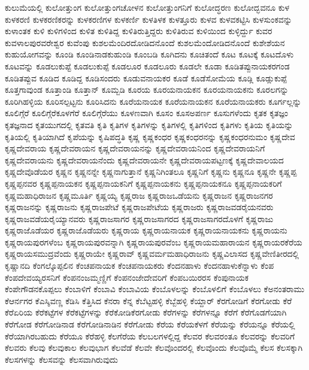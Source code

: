 {ಕುಲುಮೆಯಲ್ಲಿ
ಕುಲೋತ್ತುಂಗ
ಕುಲೋತ್ತುಂಗಚೋಳನ
ಕುಲೋತ್ತುಂಗನಿಗೆ
ಕುಲೋದ್ಧರಣ
ಕುಲೋದ್ಭವನೂ
ಕುಳ
ಕುಳಕರಣಿ
ಕುಳಕರಣಿಕರನ್ನು
ಕುಳಕರಣಿಗಳ
ಕುಳಕರ್ಣಿ
ಕುಳತಿಳಕ
ಕುಳತ್ತೂರು
ಕುಳವ
ಕುಳವಕಟ್ಟಿಸಿ
ಕುಳಸುಂಕವನ್ನು
ಕುಳಾಂತಕ
ಕುಳಿ
ಕುಳಿಗಳಿಂದ
ಕುಳಿತ
ಕುಳಿತಿದ್ದ
ಕುಳಿತಿರುತ್ತಿದ್ದರು
ಕುಳಿತಿರುವ
ಕುಳಿಯಿಂದ
ಕುಳ್ಳಿರ್ದ್ದು
ಕುವರ
ಕುವಳಾಲಪುರವರೇಶ್ವರ
ಕುವೆಂಪು
ಕುಶಲಮೆಂದಿರದೋಡಿದನೊಂದೆ
ಕುಶಲಮೆಂದೋಡಿದನೊಂದೆ
ಕುಶೇಶೆಯನ
ಕುಹುಯೋಗವನ್ನು
ಕೂಂಡಿ
ಕೂಂಡಿನಾಡಕುಹುಂಡಿ
ಕೂಂಬಡಿ
ಕೂಗಿದನು
ಕೂಚಿತಂದೆ
ಕೂಟ
ಕೂಟಕ್ಕೆ
ಕೂಟದೊಳು
ಕೂಟವನ್ನು
ಕೂಡಲುಕುಪ್ಟೆ
ಕೂಡಲುಕುಪ್ಪೆ
ಕೂಡಲೂರ
ಕೂಡಲೂರು
ಕೂಡಲೇ
ಕೂಡಾ
ಕೂಡಿತಪ್ಪುನಾಯಕರಗಂಡ
ಕೂಡಿತಪ್ಪುವ
ಕೂಡಿದ
ಕೂಡಿದ್ದ
ಕೂಡಿಸಂದರು
ಕೂಡುವನಾಯಕರ
ಕೂಡೆ
ಕೂಡೆಸೋಮೆಯ
ಕೂಡ್ಲಿ
ಕೂಡ್ಲುಕುಪ್ಪೆ
ಕೂತ್ತಗಾವುಂಡ
ಕೂತ್ತಾಂಡಿ
ಕೂತ್ತಾನ್
ಕೂಮ್ಬಡಿ
ಕೂರಯ
ಕೂರಯನಾಯಕನ
ಕೂರಯನಾಯಕನು
ಕೂರಲಗನ್ನು
ಕೂರಿಗಿಹಳ್ಳಿಯ
ಕೂರಿಸಲ್ಪಟ್ಟನು
ಕೂರಿಸಿದನು
ಕೂರೆಯನಾಯಕ
ಕೂರೆಯನಾಯಕನ
ಕೂರೆಯನಾಯಕರು
ಕೂರ್ಗಲ್ಲನ್ನು
ಕೂಲಿಗ್ಗೆರೆ
ಕೂಲಿಗ್ಗೆರೆಕೂಳಗೆರೆ
ಕೂಲಿಗ್ಗೆರೆಯು
ಕೂಳಣವಾಗಿ
ಕೂಸಂ
ಕೂಸಅಪರ್ಣ
ಕೂಸುಗಳೆಂದು
ಕೃತಕ
ಕೃತಜ್ಞಂ
ಕೃತಜ್ಞನಾದ
ಕೃತಯುಗದಲ್ಲಿ
ಕೃತವತಿ
ಕೃತಿ
ಕೃತಿಗಳ
ಕೃತಿಗಳನ್ನು
ಕೃತಿಗಳಲ್ಲಿ
ಕೃತಿಗಳಿಂದ
ಕೃತಿಗಳು
ಕೃತಿಯ
ಕೃತಿಯನ್ನು
ಕೃತಿಯಲ್ಲಿ
ಕೃತಿಯಾಗಿದೆ
ಕೃಪೆಯನ್ನು
ಕೃಷಿಪದ್ಧತಿ
ಕೃಷ್ಣ
ಕೃಷ್ಣಕಂಧರ
ಕೃಷ್ಣಕಂಧರನನ್ನು
ಕೃಷ್ಣಕಂಧರನುಮಂ
ಕೃಷ್ಣದೇವ
ಕೃಷ್ಣದೇವರಾಯ
ಕೃಷ್ಣದೇವರಾಯನ
ಕೃಷ್ಣದೇವರಾಯನನ್ನು
ಕೃಷ್ಣದೇವರಾಯನಿಂದ
ಕೃಷ್ಣದೇವರಾಯನಿಗೆ
ಕೃಷ್ಣದೇವರಾಯನು
ಕೃಷ್ಣದೇವರಾಯನೆಂದು
ಕೃಷ್ಣದೇವರಾಯನೇ
ಕೃಷ್ಣದೇವರಾಯಪಟ್ಟಣಕ್ಕೆ
ಕೃಷ್ಣದೇವಾಲಯದ
ಕೃಷ್ಣದೇವೊಡೆಯರ
ಕೃಷ್ಣನ
ಕೃಷ್ಣನನ್ನೇ
ಕೃಷ್ಣನಾಗುತ್ತಾನೆ
ಕೃಷ್ಣನಿಗಿಂತಲೂ
ಕೃಷ್ಣನಿಗೆ
ಕೃಷ್ಣನು
ಕೃಷ್ಣನೂ
ಕೃಷ್ಣನೇ
ಕೃಷ್ಣಪ್ಪ
ಕೃಷ್ಣಪ್ಪನವರ
ಕೃಷ್ಣಪ್ಪನಾಯಕನ
ಕೃಷ್ಣಪ್ಪನಾಯಕನಿಗೆ
ಕೃಷ್ಣಪ್ಪನಾಯಕನು
ಕೃಷ್ಣಪ್ಪನಾಯಕನೂ
ಕೃಷ್ಣಪ್ಪನಾಯಕರಿಗೆ
ಕೃಷ್ಣಮಹಾಧಿರಾಜನ
ಕೃಷ್ಣಮೂರ್ತಿ
ಕೃಷ್ಣಯ್ಯ
ಕೃಷ್ಣರಾಜ
ಕೃಷ್ಣರಾಜಒಡೆಯನು
ಕೃಷ್ಣರಾಜನ
ಕೃಷ್ಣರಾಜನಗರ
ಕೃಷ್ಣರಾಜನನ್ನು
ಕೃಷ್ಣರಾಜನು
ಕೃಷ್ಣರಾಜಪೇಟೆ
ಕೃಷ್ಣರಾಜಪೇಟೆಯ
ಕೃಷ್ಣರಾಜರು
ಕೃಷ್ಣರಾಜವಡರೈಯನವರು
ಕೃಷ್ಣರಾಜವಡೆಯರೈಯ್ಯಾನವರು
ಕೃಷ್ಣರಾಜಸಾಗರ
ಕೃಷ್ಣರಾಜಸಾಗರದ
ಕೃಷ್ಣರಾಜಸಾಗರದೊಳಗೆ
ಕೃಷ್ಣರಾಜು
ಕೃಷ್ಣರಾಜೊಡೆಯರ
ಕೃಷ್ಣರಾಜೊಡೆಯರು
ಕೃಷ್ಣರಾಯ
ಕೃಷ್ಣರಾಯನಾಯಕ
ಕೃಷ್ಣರಾಯನಾಯಕನು
ಕೃಷ್ಣರಾಯನು
ಕೃಷ್ಣರಾಯಪುರಗಳೆಂಬ
ಕೃಷ್ಣರಾಯಪುರವನ್ನಾಗಿ
ಕೃಷ್ಣರಾಯಪುರವೆಂಬ
ಕೃಷ್ಣರಾಯಮಹಾರಾಯನ
ಕೃಷ್ಣರಾಯರಕೆರೆಯ
ಕೃಷ್ಣರಾಯಸಮುದ್ರವೆಂದು
ಕೃಷ್ಣರಾಯೇ
ಕೃಷ್ಣರಾವ್
ಕೃಷ್ಣವರ್ಮಮಹಾಧಿರಾಜನು
ಕೃಷ್ಣವಿಲಾಸದ
ಕೃಷ್ಣವೇಣಿತೀರದಲ್ಲಿ
ಕೃಷ್ಣಾನದಿ
ಕೆಂಗಲ್ಕೊಪ್ಪಲಿನ
ಕೆಂಚಪನಾಯಕ
ಕೆಂಚಪನಾಯಕರು
ಕೆಂದನಹಾಳು
ಕೆಂದನಹಾಳುಕೆನ್ನಾಳು
ಕೆಂಪ
ಕೆಂಪದೇವಯ್ಯರಸನಿಗೆ
ಕೆಂಪನಂಜಮ್ಮಣ್ಣಿಗೆ
ಕೆಂಪನಂಜೇದೇವರಿಗೆ
ಕೆಂಪಬಯಿರರಸ
ಕೆಂಪುನಾಯಕ
ಕೆಂಪೇಗೌಡನಕೊಪ್ಪಲು
ಕೆಂಬಾಳಿಗೆ
ಕೆಂಬಾವಿ
ಕೆಂಬಾವಿಯ
ಕೆಂಬೊಳಲನ್ನು
ಕೆಂಬೊಳಲಿಗೆ
ಕೆಂಬೊಳಲು
ಕೆಅನಂತರಾಮು
ಕೆಆರ್ನಗರ
ಕೆಎಸ್ಶಿವಣ್ಣ
ಕೆಡಿಸಿ
ಕೆತ್ತಿಸಿದ
ಕೆನರಾ
ಕೆನ್ನ
ಕೆಬೆಟ್ಟಹಳ್ಳಿ
ಕೆಬ್ಬೆಹಳ್ಳಿ
ಕೆಯ್ದಾರ್
ಕೆರಗೋಡಿಗೆ
ಕೆರಗೋಡು
ಕೆರೆ
ಕೆರೆಏರಿಯ
ಕೆರೆಕಟ್ಟೆಗಳ
ಕೆರೆಕಟ್ಟೆಗಳನ್ನು
ಕೆರೆಕೋಡಿಕೆರಗೋಡು
ಕೆರೆಗಳನ್ನು
ಕೆರೆಗಳನ್ನೂ
ಕೆರೆಗೆ
ಕೆರೆಗೊಡಗೆಯಾಗಿ
ಕೆರೆಗೋಡ
ಕೆರೆಗೋಡಿನಾಡ
ಕೆರೆಗೋಡಿನಾಡಿನ
ಕೆರೆಗೋಡು
ಕೆರೆಯ
ಕೆರೆಯಕೆಳಗೆ
ಕೆರೆಯನ್ನು
ಕೆರೆಯನ್ನೂ
ಕೆರೆಯಲ್ಲಿ
ಕೆರೆಯಾಗಿರಬಹುದು
ಕೆರೆಯೂ
ಕೆರೆಹಳ್ಳಿ
ಕೆಲಗೆರೆಯ
ಕೆಲಬಲಗಳಲ್ಲಿದ್ದ
ಕೆಲವರ
ಕೆಲವರಂತೂ
ಕೆಲವರನ್ನು
ಕೆಲವರಿಗೆ
ಕೆಲವರು
ಕೆಲವು
ಕೆಲವುಕಾಲ
ಕೆಲವುಭಾಗ
ಕೆಲವೆಡೆ
ಕೆಲವೇ
ಕೆಲವೊಂದರಲ್ಲಿ
ಕೆಲವೊಂದು
ಕೆಲವೊಮ್ಮೆ
ಕೆಲಸ
ಕೆಲಸಕ್ಕಾಗಿ
ಕೆಲಸಗಳನ್ನು
ಕೆಲಸವನ್ನು
ಕೆಲಸವಾಗಿರುವುದು
}
